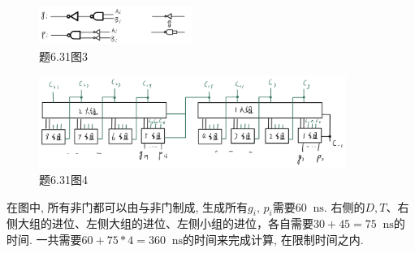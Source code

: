 \documentclass[UTF8]{report}
\newcommand*{\unit}[1]{\mathop{}\!\mathrm{#1}}
\newenvironment{solution}{{\noindent\hskip 2em \bf 解 \quad}}{}
\begin{document}
\begin{solution}
    \begin{figure}[!htbp]
        \centering
        \includegraphics[width=5cm]{fig/6.31_表示.png}
        \caption{题6.31图3}
        \label{fig:6_31_3}
    \end{figure}
    \begin{figure}[!htbp]
        \centering
        \includegraphics[width=10cm]{fig/6.31_进位链.png}
        \caption{题6.31图4}
        \label{fig:6_31_4}
    \end{figure}

    在图中, 所有非门都可以由与非门制成, 生成所有$g_i,\,p_i$需要$60 \unit{ns}$. 右侧的$D,T$、右侧大组的进位、左侧大组的进位、左侧小组的进位，各自需要$30+45=75 \unit{ns}$的时间. 一共需要$60 + 75*4 = 360 \unit{ns}$的时间来完成计算, 在限制时间之内.
\end{solution}
    
\end{document}
